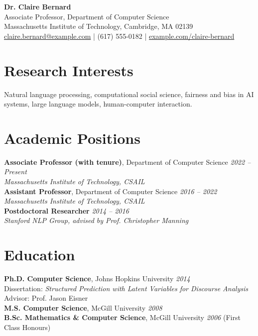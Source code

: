 \documentclass[11pt,a4paper]{article}
\begin{document}
\begin{center}
  {\LARGE \textbf{Dr. Claire Bernard}}\\[4pt]
  Associate Professor, Department of Computer Science\\
  Massachusetts Institute of Technology, Cambridge, MA 02139\\[3pt]
  \href{mailto:claire.bernard@example.com}{claire.bernard@example.com} \quad|\quad
  (617) 555-0182 \quad|\quad
  \href{https://example.com/claire-bernard}{example.com/claire-bernard}
\end{center}

\vspace{4pt}

\section{Research Interests}
Natural language processing, computational social science, fairness and bias in AI systems, large language models, human-computer interaction.

\section{Academic Positions}
\noindent\textbf{Associate Professor (with tenure)}, Department of Computer Science \hfill \textit{2022 -- Present}\\
\textit{Massachusetts Institute of Technology, CSAIL}\\[3pt]
\noindent\textbf{Assistant Professor}, Department of Computer Science \hfill \textit{2016 -- 2022}\\
\textit{Massachusetts Institute of Technology, CSAIL}\\[3pt]
\noindent\textbf{Postdoctoral Researcher} \hfill \textit{2014 -- 2016}\\
\textit{Stanford NLP Group, advised by Prof. Christopher Manning}

\section{Education}
\textbf{Ph.D. Computer Science}, Johns Hopkins University \hfill \textit{2014}\\
Dissertation: \textit{Structured Prediction with Latent Variables for Discourse Analysis}\\
Advisor: Prof. Jason Eisner\\[3pt]
\textbf{M.S. Computer Science}, McGill University \hfill \textit{2008}\\
\textbf{B.Sc. Mathematics \& Computer Science}, McGill University \hfill \textit{2006} \quad (First Class Honours)
\end{document}
